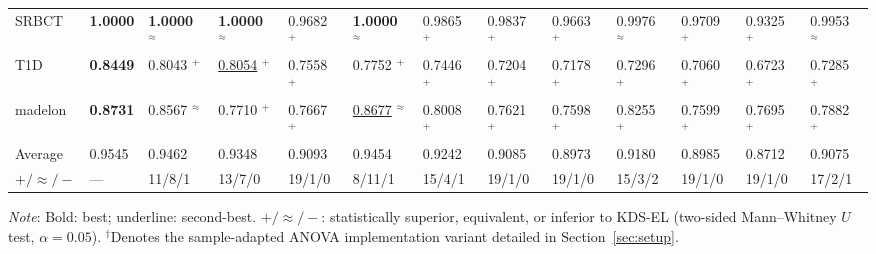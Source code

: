 \begin{table}[t]
{\begin{tabular}{l *{12}{w{c}{33pt}}}
SRBCT            & \textbf{1.0000} & \textbf{1.0000} $^{\approx}$ & \textbf{1.0000} $^{\approx}$ & 0.9682 $^{+}$ & \textbf{1.0000} $^{\approx}$ & 0.9865 $^{+}$ & 0.9837 $^{+}$ & 0.9663 $^{+}$ & 0.9976 $^{\approx}$ & 0.9709 $^{+}$ & 0.9325 $^{+}$ & 0.9953 $^{\approx}$ \\
T1D              & \textbf{0.8449} & 0.8043 $^{+}$ & \underline{0.8054} $^{+}$ & 0.7558 $^{+}$ & 0.7752 $^{+}$ & 0.7446 $^{+}$ & 0.7204 $^{+}$ & 0.7178 $^{+}$ & 0.7296 $^{+}$ & 0.7060 $^{+}$ & 0.6723 $^{+}$ & 0.7285 $^{+}$ \\
madelon          & \textbf{0.8731} & 0.8567 $^{\approx}$ & 0.7710 $^{+}$ & 0.7667 $^{+}$ & \underline{0.8677} $^{\approx}$ & 0.8008 $^{+}$ & 0.7621 $^{+}$ & 0.7598 $^{+}$ & 0.8255 $^{+}$ & 0.7599 $^{+}$ & 0.7695 $^{+}$ & 0.7882 $^{+}$ \\
\midrule
Average          & 0.9545 & 0.9462 & 0.9348 & 0.9093 & 0.9454 & 0.9242 & 0.9085 & 0.8973 & 0.9180 & 0.8985 & 0.8712 & 0.9075 \\
$+ / \approx / -$ & — & 11/8/1 & 13/7/0 & 19/1/0 & 8/11/1 & 15/4/1 & 19/1/0 & 19/1/0 & 15/3/2 & 19/1/0 & 19/1/0 & 17/2/1 \\
\bottomrule
\end{tabular}
}
\vspace{2pt}
\par\raggedright\footnotesize
\textit{Note}: Bold: best; underline: second-best. $+ / \approx / -$: statistically superior, equivalent, or inferior to KDS-EL (two-sided Mann--Whitney $U$ test, $\alpha = 0.05$). $^{\dagger}$Denotes the sample-adapted ANOVA implementation variant detailed in Section~\ref{sec:setup}.
\end{table}